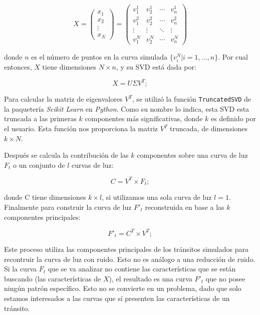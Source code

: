 \begin{equation}
  X = 
  \begin{pmatrix}
  x_{1} \\
  x_{2}\\
  \vdots  \\
  x_{N}
  \end{pmatrix}=
  \begin{pmatrix}
    v^{1}_{1} & v^{1}_{2} & \cdots & v^{1}_{n} \\
    v^{2}_{1} & v^{2}_{2} & \cdots & v^{2}_{n} \\
    \vdots  & \vdots  & \ddots & \vdots  \\
    v^{N}_{1} & v^{N}_{2} & \cdots & v^{N}_{n} 
  \end{pmatrix}
\end{equation}

donde $n$ es el número de puntos en la curva simulada $\{v^{N}_{i}|i=1,...,n\}$. Por cual entonces, $X$ tiene dimensiones $N\times n$, y su SVD está dada por:

\begin{equation}
  \displaystyle X=U\Sigma V^{T};
\end{equation}

Para calcular la matriz de eigenvalores $V^{T}$, se utilizó la función \texttt{TruncatedSVD} de la paquetería \textit{Scikit Learn} en \textit{Python}. Como su nombre lo indica, esta SVD esta truncada a las primeras $k$ componentes más significativas, donde $k$  es definido por el usuario. Esta función nos proporciona la matriz $V^{T}$ truncada, de dimensiones $k\times N$.

Después se calcula la contribución de las $k$ componentes sobre una curva de luz $F_{t}$ o un conjunto de $l$ curvas de luz:

\begin{equation}
  \displaystyle C=V^{T} \times F_{t};
\end{equation}

donde C tiene dimensiones $k\times l$, si utilizamos una sola curva de luz $l=1$. Finalmente para construir la curva de luz $F'_{t}$ reconstruida en base a las $k$ componentes principales:

\begin{equation}
  \displaystyle F'_{t}=C^{T} \times V^{T};
\end{equation}

Este proceso utiliza las componentes principales de los tránsitos simulados para recontruir la curva de luz con ruido. Esto no es análogo a una reducción de ruido. Si la curva $F_{t}$ que se va analizar no contiene las características que se están buscando (las características de $X$), el resultado es una curva $F'_{t}$ que no posee ningún patrón específico. Esto no se convierte en un problema, dado que solo estamos interesados a las curvas que sí presenten las características de un tránsito.


